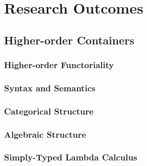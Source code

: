\chapter{Research Outcomes}

\section{Higher-order Containers}

\subsection{Higher-order Functoriality}

\subsection{Syntax and Semantics}

\subsection{Categorical Structure}

\subsection{Algebraic Structure}

\subsection{Simply-Typed Lambda Calculus}